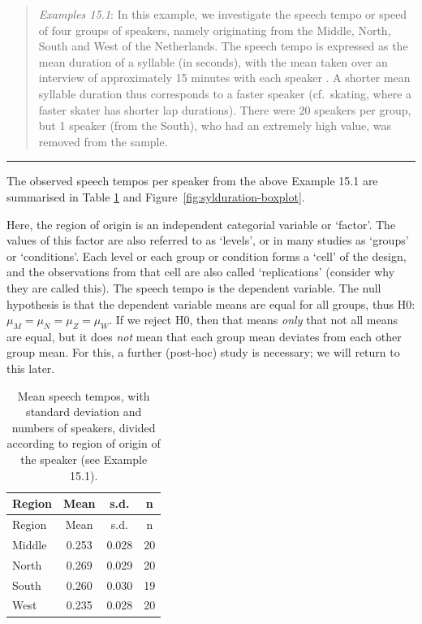 \documentclass[
]{book}
\begin{document}
\begin{quote}
\emph{Examples 15.1}: In this example, we investigate the speech tempo or
speed of four groups of speakers, namely originating from the Middle, North,
South and West of the Netherlands. The speech tempo is expressed as the mean
duration of a syllable (in seconds), with the mean taken over an interview of approximately
15 minutes with each speaker \citep{Quene08} \citep{R-hqmisc}.
A shorter mean syllable duration thus corresponds to a faster speaker (cf.~skating, where a faster skater has shorter lap durations). There were 20
speakers per group, but 1 speaker (from the South), who had an extremely high value,
was removed from the sample.
\end{quote}

\begin{center}\rule{0.5\linewidth}{0.5pt}\end{center}

The observed speech tempos per speaker from the above Example 15.1 are summarised
in Table \ref{tab:sylduration} and Figure~\ref{fig:sylduration-boxplot}.

Here, the region of origin is an independent categorial variable or `factor'.
The values of this factor are also referred to as `levels', or in many studies
as `groups' or `conditions'. Each level or each group or condition forms
a `cell' of the design, and the observations from that cell are also
called `replications' (consider why they are called this).
The speech tempo is the dependent variable. The null hypothesis is that the dependent variable means are equal for all groups, thus
H0: \(\mu_M = \mu_N = \mu_Z = \mu_W\). If we reject H0, then that means
\emph{only} that not all means are equal, but it does \emph{not} mean that each group mean deviates from each other group mean. For this, a further (post-hoc)
study is necessary; we will return to this later.

\begin{longtable}[]{@{}lccc@{}}
\caption{\label{tab:sylduration} Mean speech tempos, with standard deviation and numbers
of speakers, divided according to region of origin of the speaker (see Example
15.1).}\tabularnewline
\toprule
Region & Mean & s.d. & n \\
\midrule
\endfirsthead
\toprule
Region & Mean & s.d. & n \\
\midrule
\endhead
Middle & 0.253 & 0.028 & 20 \\
North & 0.269 & 0.029 & 20 \\
South & 0.260 & 0.030 & 19 \\
West & 0.235 & 0.028 & 20 \\
\bottomrule
\end{longtable}
\end{document}
